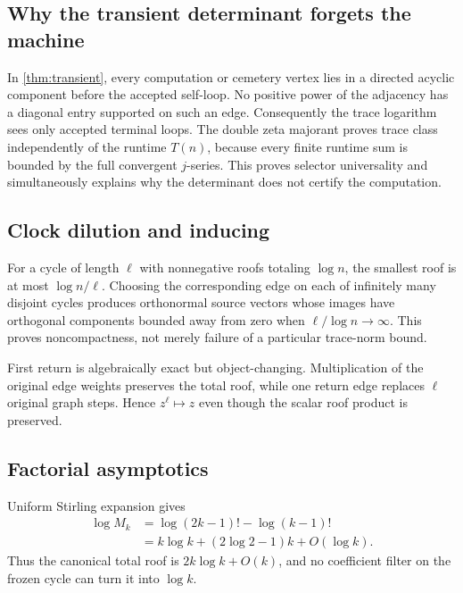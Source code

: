 \subsection{Why the transient determinant forgets the machine}

In \cref{thm:transient}, every computation or cemetery vertex lies in a
directed acyclic component before the accepted self-loop.  No positive
power of the adjacency has a diagonal entry supported on such an edge.
Consequently the trace logarithm sees only accepted terminal loops.  The
double zeta majorant proves trace class independently of the runtime
$T(n)$, because every finite runtime sum is bounded by the full convergent
$j$-series.  This proves selector universality and simultaneously explains
why the determinant does not certify the computation.

\subsection{Clock dilution and inducing}

For a cycle of length $\ell$ with nonnegative roofs totaling $\log n$,
the smallest roof is at most $\log n/\ell$.  Choosing the corresponding
edge on each of infinitely many disjoint cycles produces orthonormal source
vectors whose images have orthogonal components bounded away from zero
when $\ell/\log n\to\infty$.  This proves noncompactness, not merely failure
of a particular trace-norm bound.

First return is algebraically exact but object-changing.  Multiplication of
the original edge weights preserves the total roof, while one return edge
replaces $\ell$ original graph steps.  Hence
$z^\ell\mapsto z$ even though the scalar roof product is preserved.

\subsection{Factorial asymptotics}

Uniform Stirling expansion gives
\[
\begin{aligned}
\log M_k
 &=\log(2k-1)!-\log(k-1)!\\
 &=k\log k+(2\log2-1)k+O(\log k).
\end{aligned}
\]
Thus the canonical total roof is $2k\log k+O(k)$, and no coefficient
filter on the frozen cycle can turn it into $\log k$.
